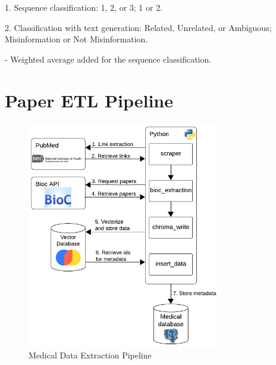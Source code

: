     1. Sequence classification: 1, 2, or 3; 1 or 2.

    2. Classification with text generation: Related, Unrelated, or Ambiguous; Misinformation or Not Misinformation.

- Weighted average added for the sequence classification.


\section{Paper ETL Pipeline}

\begin{figure}[H]
	\begin{center}
		\includegraphics[width=0.75\textwidth]{images/ETL_Pipeline} %
	\end{center}
	\caption{Medical Data Extraction Pipeline} %
	\label{fig:etl}
\end{figure}

